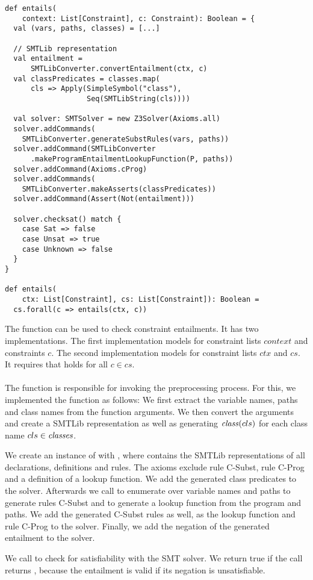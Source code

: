\begin{lstlisting}[caption={Entailment Function},label=lst:entails,captionpos=b,frame={lines}]
def entails(
    context: List[Constraint], c: Constraint): Boolean = {
  val (vars, paths, classes) = [...]

  // SMTLib representation
  val entailment =
      SMTLibConverter.convertEntailment(ctx, c)
  val classPredicates = classes.map(
      cls => Apply(SimpleSymbol("class"),
                   Seq(SMTLibString(cls))))

  val solver: SMTSolver = new Z3Solver(Axioms.all)
  solver.addCommands(
    SMTLibConverter.generateSubstRules(vars, paths))
  solver.addCommand(SMTLibConverter
      .makeProgramEntailmentLookupFunction(P, paths))
  solver.addCommand(Axioms.cProg)
  solver.addCommands(
    SMTLibConverter.makeAsserts(classPredicates))
  solver.addCommand(Assert(Not(entailment)))

  solver.checksat() match {
    case Sat => false
    case Unsat => true
    case Unknown => false
  }
}

def entails(
    ctx: List[Constraint], cs: List[Constraint]): Boolean =
  cs.forall(c => entails(ctx, c))
\end{lstlisting}
%
The function  can be used
to check constraint entailments.
It has two implementations.
The first implementation models 
for constraint lists $context$ and constraints $c$.
The second implementation models 
for constraint lists $ctx$ and $cs$.
It requires that  holds for
all $c \in cs$.\\
\\
The function is responsible for
invoking the preprocessing process.
For this, we implemented the function as follows:
We first extract the variable names, paths
and class names from the function arguments.
We then convert the arguments and create
a SMTLib representation 
as well as generating $\mathit{class}(cls)$
for each class name $cls \in \mathit{classes}$.

We create an instance of 
with , where 
contains the SMTLib representations of all
declarations, definitions and rules.
The axioms exclude rule C-Subst, rule C-Prog
and a definition of a lookup function.
We add the generated class predicates to the solver.
Afterwards we call 
to enumerate over variable names and paths to
generate rules C-Subst
and 
to generate a lookup function from the program and paths.
We add the generated C-Subst rules as well,
as the lookup function and rule C-Prog to the solver.
Finally, we add the negation of the generated
entailment  to the solver.

We call  to check
for satisfiability with the SMT solver.
We return true if the call returns ,
because the entailment 
is valid if its negation is unsatisfiable.

